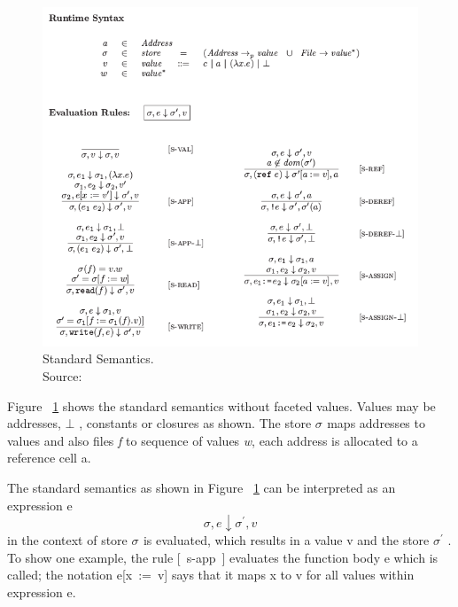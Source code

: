 \begin{figure}
\centering
\includegraphics[width=1\textwidth]{images/fig2.png}
\caption[Standard Semantics.]{Standard Semantics. \\Source: ~\cite{bib4} } 
\label{fig:Source_semantics}
\end{figure}

Figure ~\ref{fig:Source_semantics} shows the standard semantics without faceted values. Values may be addresses, $\bot$ , constants or closures as shown. The store $\sigma_{}$ maps addresses to values and also files {\it f} to sequence of values {\it w}, each address is allocated to a reference cell a.

The standard semantics as shown in Figure ~\ref{fig:Source_semantics} can be interpreted as an expression e  
$$
\sigma ,e \downarrow \sigma^{'} ,v 
$$
in the context of store $\sigma_{}$ is evaluated, which results in a value v and the store $\sigma^{'}$ . To show one example, the rule [\ s-app\ ] evaluates the function body e which is called; the notation e[x\ :=\ v] says that it maps x to v for all values within expression e.

